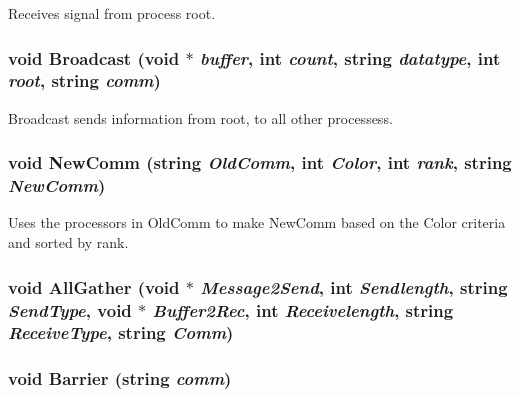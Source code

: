Receives signal from process root. \hypertarget{classJKBuilder_1_1MPIManager_ae7fbfac94b9a7fff2f378fb34b550957}{
\subsubsection[{Broadcast}]{\setlength{\rightskip}{0pt plus 5cm}void Broadcast (void $\ast$ {\em buffer}, \/  int {\em count}, \/  string {\em datatype}, \/  int {\em root}, \/  string {\em comm})}}
\label{classJKBuilder_1_1MPIManager_ae7fbfac94b9a7fff2f378fb34b550957}


Broadcast sends information from root, to all other processess. \hypertarget{classJKBuilder_1_1MPIManager_a9b48de66ac7a99bc490fe3d4d940ca47}{
\subsubsection[{NewComm}]{\setlength{\rightskip}{0pt plus 5cm}void NewComm (string {\em OldComm}, \/  int {\em Color}, \/  int {\em rank}, \/  string {\em NewComm})}}
\label{classJKBuilder_1_1MPIManager_a9b48de66ac7a99bc490fe3d4d940ca47}


Uses the processors in OldComm to make NewComm based on the Color criteria and sorted by rank. \hypertarget{classJKBuilder_1_1MPIManager_a361624cbb5157081a71a2d1038fec676}{
\subsubsection[{AllGather}]{\setlength{\rightskip}{0pt plus 5cm}void AllGather (void $\ast$ {\em Message2Send}, \/  int {\em Sendlength}, \/  string {\em SendType}, \/  void $\ast$ {\em Buffer2Rec}, \/  int {\em Receivelength}, \/  string {\em ReceiveType}, \/  string {\em Comm})}}
\label{classJKBuilder_1_1MPIManager_a361624cbb5157081a71a2d1038fec676}
\hypertarget{classJKBuilder_1_1MPIManager_a5c9f3bb8eb11f62048166357ea651f44}{
\subsubsection[{Barrier}]{\setlength{\rightskip}{0pt plus 5cm}void Barrier (string {\em comm})}}
\label{classJKBuilder_1_1MPIManager_a5c9f3bb8eb11f62048166357ea651f44}


